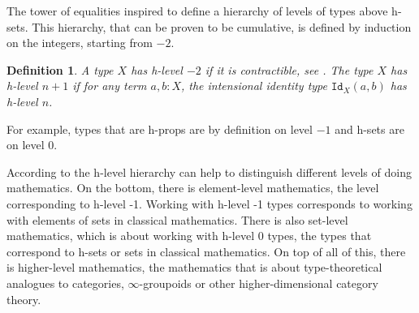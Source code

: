 \documentclass[12pt,a4paper,twoside,xetex]{book} %
\newcommand{\keyword}[1]{\emph{#1}\index{#1}}
\newtheorem{definition}[theorem]{Definition}
\newtheorem{example}[theorem]{Example}
\begin{document}
The tower of equalities inspired \cite{Voevodsky2016} to define a hierarchy of 
levels of types above h-sets. This hierarchy, that can be proven to be 
cumulative, is defined by induction on the integers, starting from $-2$. 

\begin{definition}\label{hlevel}
A type $X$ has \keyword{h-level} $-2$ if it is contractible, see . The type $X$ has h-level 
$n+1$ if for any term $a,b:X$, the intensional identity type $\texttt{Id}_X(a,b)$ 
has h-level $n$.
\end{definition}


For example, types that are h-props are by definition on level $-1$ and h-sets are on 
level $0$. 

% 
% 
% 

According to \cite{Voevodsky2016} the h-level hierarchy can help to distinguish 
different levels of doing mathematics. On the bottom, there is element-level 
mathematics, the level corresponding to h-level -1. Working with  h-level -1 
types corresponds to working with elements of sets in classical mathematics. 
There is also set-level mathematics, which is about working with h-level 0 
types, the types that correspond to h-sets or sets in classical mathematics. On 
top of all of this, there is higher-level mathematics, the mathematics that is 
about type-theoretical analogues to categories, $\infty$-groupoids or other 
higher-dimensional category theory.
\end{document}
